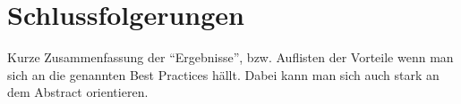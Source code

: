 \section{Schlussfolgerungen}
\label{sec:schlussfolgerungen}

\begin{wichtigbox}
Kurze Zusammenfassung der \enquote{Ergebnisse}, bzw. Auflisten der Vorteile
wenn man sich an die genannten Best Practices hällt. Dabei kann man sich auch
stark an dem Abstract orientieren.
\end{wichtigbox}
